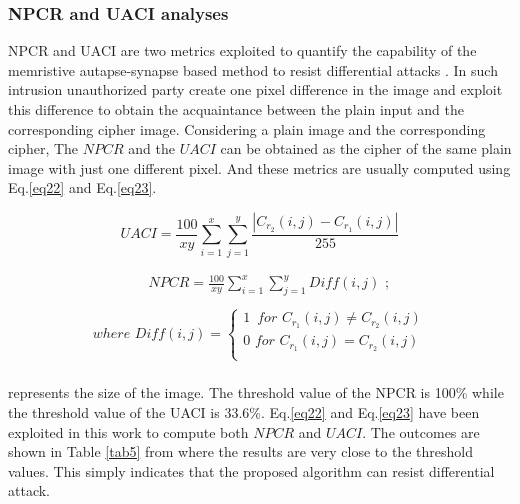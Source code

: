 \documentclass[journal]{IEEEtran/IEEEtran}
\begin{document}
\subsubsection{NPCR and UACI analyses}

NPCR and UACI are two metrics exploited to quantify the capability of the memristive autapse-synapse based method to resist differential attacks \cite{xu2021invertible}. In such intrusion unauthorized party create one pixel difference in the image and exploit this difference to obtain the acquaintance between the plain input and the corresponding cipher image. Considering a plain image and the corresponding cipher, The $ N\!P\!C\!R $ and the $ U\!A\!C\!I $  can be obtained as the cipher of the same plain image with just one different pixel.  And these metrics are usually computed using Eq.\ref{eq22} and Eq.\ref{eq23}.

\begin{equation}\label{eq22}
U\!A\!C\!I = \frac{{100}}{{xy}}\sum\limits_{i = 1}^x {\sum\limits_{j = 1}^y {\frac{{\left| {{C_{{r_2}}}(i,j) - {C_{{r_1}}}(i,j)} \right|}}{{255}}} } 
\end{equation}

\begin{equation}\label{eq23}
\begin{array}{l}
\,\,\,\,\,\,\,\,\,\,\,\,\,\,\,\,\,\,\,\,\,\,\,\, N\!P\!C\!R = \frac{{100}}{{xy}}\sum\limits_{i = 1}^x {\sum\limits_{j = 1}^y {Diff(i,j)} } \,\,; \\ 
\\
 where\,\,Diff(i,j) = \left\{ \begin{array}{l}
 1\,\,\,for\,\,{C_{{r_1}}}(i,j) \ne {C_{{r_2}}}(i,j) \\ 
 0\,\,for\,\,{C_{{r_1}}}(i,j) = {C_{{r_2}}}(i,j) \\ 
 \end{array} \right. \\ 
 \end{array}
\end{equation}


represents the size of the image. The threshold value of the NPCR is 100\% while the threshold value of the UACI is 33.6\%. Eq.\ref{eq22} and Eq.\ref{eq23} have been exploited in this work to compute both $ N\!P\!C\!R $ and $ U\!A\!C\!I $. The outcomes are shown in Table \ref{tab5} from where the results are very close to the threshold values. This simply indicates that the proposed algorithm can resist differential attack.   
\end{document}
